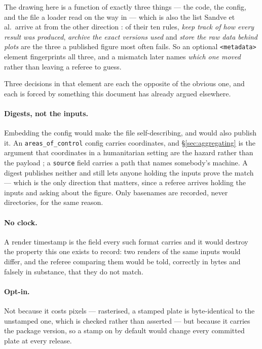 \documentclass[11pt]{article}
\begin{document}
The drawing here is a function of exactly three things --- the code, the
config, and the file a loader read on the way in --- which is also the list
Sandve et al.\ arrive at from the other direction \parencite{sandve-reproducible}:
of their ten rules, \emph{keep track of how every result was produced},
\emph{archive the exact versions used} and \emph{store the raw data behind
plots} are the three a published figure most often fails. So an optional
\texttt{<metadata>} element fingerprints all three, and a mismatch later
names \emph{which one moved} rather than leaving a referee to guess.

Three decisions in that element are each the opposite of the obvious one,
and each is forced by something this document has already argued elsewhere.

\paragraph{Digests, not the inputs.} Embedding the config would make the file
self-describing, and would also publish it. An \texttt{areas\_of\_control}
config carries coordinates, and \S\ref{sec:aggregating} is the argument that
coordinates in a humanitarian setting are the hazard rather than the payload
\parencite{ocha-data-responsibility}; a \texttt{source} field carries a path that
names somebody's machine. A digest publishes neither and still lets anyone
holding the inputs prove the match --- which is the only direction that
matters, since a referee arrives holding the inputs and asking about the
figure. Only basenames are recorded, never directories, for the same reason.

\paragraph{No clock.} A render timestamp is the field every such format
carries and it would destroy the property this one exists to record: two
renders of the same inputs would differ, and the referee comparing them would
be told, correctly in bytes and falsely in substance, that they do not match.

\paragraph{Opt-in.} Not because it costs pixels --- rasterised, a stamped
plate is byte-identical to the unstamped one, which is checked rather than
asserted --- but because it carries the package version, so a stamp on by
default would change every committed plate at every release.
\end{document}
